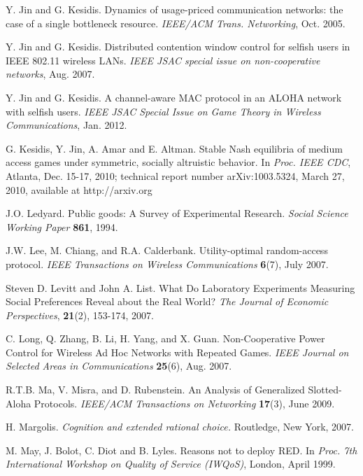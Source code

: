\documentclass[12pt,onecolumn,draftcls]{IEEEtran}
\begin{document}
\begin{thebibliography}{9}
Y. Jin and G. Kesidis.
Dynamics of usage-priced communication networks:
the case of a single bottleneck resource.
        {\em IEEE/ACM Trans. Networking},
        Oct. 2005.



Y. Jin and G. Kesidis. Distributed contention window control
for selfish users in IEEE 802.11 wireless LANs. {\em IEEE JSAC
special issue on non-cooperative networks}, Aug. 2007.

Y. Jin and G. Kesidis.
A channel-aware MAC protocol in an ALOHA
network with selfish users.
{\em IEEE JSAC Special Issue on Game Theory in Wireless Communications},
Jan. 2012.

G. Kesidis, Y. Jin, A. Amar and E. Altman.
Stable Nash equilibria of medium access games
under symmetric, socially altruistic behavior.
In {\em Proc. IEEE CDC}, Atlanta, Dec. 15-17, 2010;
technical report number arXiv:1003.5324,
March 27, 2010,
available at http://arxiv.org 




J.O. Ledyard.
Public goods: A Survey of Experimental Research.
{\em Social Science Working Paper} {\bf 861},
1994.

J.W. Lee, M. Chiang, and R.A. Calderbank.
Utility-optimal random-access protocol.
{\em IEEE Transactions on Wireless Communications}
{\bf 6}(7), July 2007.





Steven D. Levitt and John A. List.
What Do Laboratory Experiments Measuring Social Preferences Reveal about the Real World?
{\em The Journal of Economic Perspectives}, 
{\bf 21}(2), 153-174, 2007.

C. Long, Q. Zhang, B. Li, H. Yang, and X. Guan.
Non-Cooperative Power Control for Wireless Ad Hoc Networks with Repeated Games.
{\em IEEE Journal on Selected Areas in Communications}
{\bf 25}(6), Aug. 2007.

R.T.B. Ma, V. Misra, and D. Rubenstein.
An Analysis of Generalized Slotted-Aloha Protocols.
{\em IEEE/ACM Transactions on Networking}
{\bf 17}(3), June 2009.



H. Margolis.
{\em Cognition and extended rational choice.}
Routledge, New York, 2007.

M. May, J. Bolot, C. Diot and B. Lyles.
Reasons not to deploy RED.
In {\em Proc. 7th International Workshop on Quality of
Service (IWQoS)}, London, April 1999.



\end{thebibliography}
\end{document}
